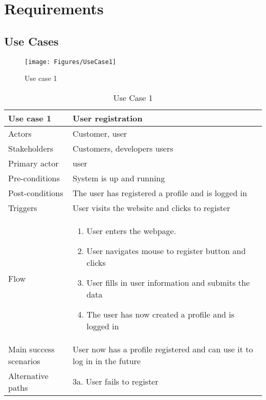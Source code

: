 \chapter{Requirements}


\section{Use Cases}

\begin{figure}[H]
\centering
\texttt{[image: Figures/UseCase1]}
\caption{Use case 1}
    \label{fig:UC1}
    \end{figure}

\begin{table}[H]
\begin{tabular}{ | L{0.25\linewidth} | L{0.75\linewidth} | } 
 \hline {}
 Use case 1 & User registration  \\ 
 \hline
 Actors & Customer, user \\ 
 \hline
 Stakeholders & Customers, developers users \\ 
  \hline
 Primary actor & user  \\ 
 \hline
 Pre-conditions & System is up and running \\ 
 \hline
 Post-conditions & The user has registered a profile and is logged in \\ 
  \hline
 Triggers & User visits the website and clicks to register \\ 
 \hline
Flow & \begin{minipage}{5in}
    \vskip 1pt
    \begin{enumerate}
  \item User enters the webpage.
  \item User navigates mouse to register button and clicks
  \item User fills in user information and submits the data
  \item The user has now created a profile and is logged in
   \end{enumerate}
   \vskip 4pt
 \end{minipage}\\ 
 \hline
 Main success scenarios & User now has a profile registered and can use it to log in in the future \\ 
 \hline
 Alternative paths & 3a. User fails to register\\
 \hline
\end{tabular}
\caption{Use Case 1}
\end{table}

